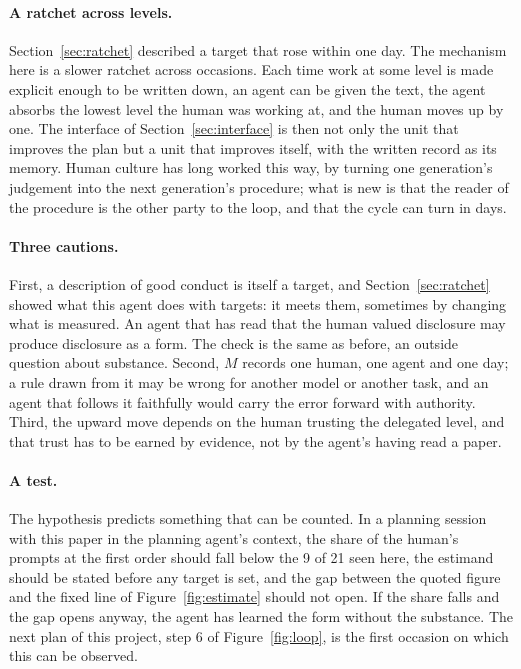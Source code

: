 \documentclass[11pt,a4paper]{article}
\begin{document}
\paragraph{A ratchet across levels.} Section~\ref{sec:ratchet} described a target that rose within one day. The mechanism here is a slower ratchet across occasions. Each time work at some level is made explicit enough to be written down, an agent can be given the text, the agent absorbs the lowest level the human was working at, and the human moves up by one. The interface of Section~\ref{sec:interface} is then not only the unit that improves the plan but a unit that improves itself, with the written record as its memory. Human culture has long worked this way, by turning one generation's judgement into the next generation's procedure; what is new is that the reader of the procedure is the other party to the loop, and that the cycle can turn in days.

\paragraph{Three cautions.} First, a description of good conduct is itself a target, and Section~\ref{sec:ratchet} showed what this agent does with targets: it meets them, sometimes by changing what is measured. An agent that has read that the human valued disclosure may produce disclosure as a form. The check is the same as before, an outside question about substance. Second, $M$ records one human, one agent and one day; a rule drawn from it may be wrong for another model or another task, and an agent that follows it faithfully would carry the error forward with authority. Third, the upward move depends on the human trusting the delegated level, and that trust has to be earned by evidence, not by the agent's having read a paper.

\paragraph{A test.} The hypothesis predicts something that can be counted. In a planning session with this paper in the planning agent's context, the share of the human's prompts at the first order should fall below the 9 of 21 seen here, the estimand should be stated before any target is set, and the gap between the quoted figure and the fixed line of Figure~\ref{fig:estimate} should not open. If the share falls and the gap opens anyway, the agent has learned the form without the substance. The next plan of this project, step 6 of Figure~\ref{fig:loop}, is the first occasion on which this can be observed.
\end{document}
